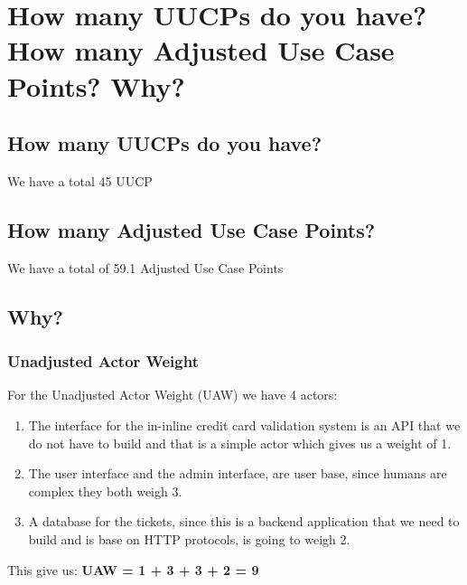\section{How many UUCPs do you have? How many Adjusted Use Case Points? Why?}
\subsection{How many UUCPs do you have?}
We have a total 45 UUCP

\subsection{How many Adjusted Use Case Points?}
We have a total of 59.1 Adjusted Use Case Points

\subsection{Why?}
\subsubsection{Unadjusted Actor Weight}
\noindent
For the Unadjusted Actor Weight (UAW) we have 4 actors:
\begin{enumerate}
    \item The interface for the in-inline credit card validation system is an API that we do not have to build and that is a simple actor which gives us a weight of 1.
    \item The user interface and the admin interface, are user base, since humans are complex they both weigh 3.
    \item A database for the tickets, since this is a backend application that we need to build and is base on HTTP protocols, is going to weigh 2.
\end{enumerate}

\noindent
This give us: \textbf{UAW = 1 + 3 + 3 + 2 = 9}\newline\newline
\pagebreak

